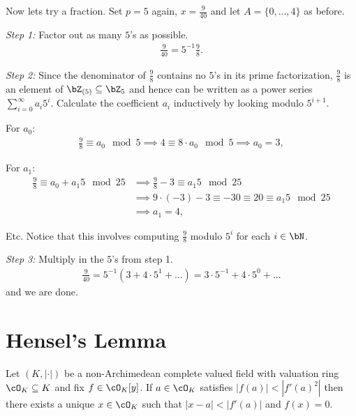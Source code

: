 \begin{example}\label{example}
	Now lets try a fraction. Set $p = 5$ again, $x = \frac{9}{40}$ and let $A = \{0,...,4\}$ as before.

	\emph{Step 1:} Factor out as many $5$'s as possible.
	\begin{align*}
		\frac{9}{40} = 5^{-1}\frac{9}{8}.
	\end{align*}
	
	\bigskip

	\emph{Step 2:} Since the denominator of $\frac{9}{8}$ contains no $5$'s in its prime factorization, $\frac{9}{8}$ is an element of $\bZ_{(5)} \subseteq \bZ_5$  and hence can be written as a power series $\sum_{i = 0}^\infty a_i5^i$. Calculate the coefficient $a_i$ inductively by looking modulo $5^{i+1}$.

	\noindent For $a_0$:
	\begin{align*}
		\frac{9}{8} \equiv a_0 \mod 5 \implies 4 \equiv 8\cdot a_0 \mod 5 \implies a_0 = 3,
	\end{align*}

	\noindent For $a_1$:
	\begin{align*}
		\frac{9}{8} \equiv a_0 + a_{1} 5 \mod 25 
		  &\implies \frac{9}{8} - 3 \equiv a_1 5 \mod 25 \\
		  &\implies 9\cdot(-3) - 3 \equiv -30 \equiv 20 \equiv a_1 5 \mod 25 \\
          &\implies a_1 = 4,
	\end{align*}
	
	\noindent Etc. Notice that this involves computing $\frac{9}{8}$ modulo $5^i$ for each $i \in \bN$.
    
	\bigskip

	\emph{Step 3:} Multiply in the $5$'s from step 1.
	\begin{align*}
		\frac{9}{40} = 5^{-1}\left(3 + 4 \cdot 5^1 + ...\right) = 3\cdot 5^{-1} + 4\cdot 5^0 + ...
	\end{align*}
	and we are done.
\end{example}

\section{Hensel's Lemma}
\begin{thm}\label{thm:hensel-lemma}
Let $(K,|\cdot|)$ be a non-Archimedean complete valued field with valuation ring $\cO_K \subseteq K$ and fix $f \in \cO_K[y]$. If $a \in \cO_K$ satisfies $|f(a)| < |f'(a)^2|$ then there exists a unique $x \in \cO_K$ such that $|x - a| < |f'(a)|$ and $f(x) = 0$.
\end{thm}


